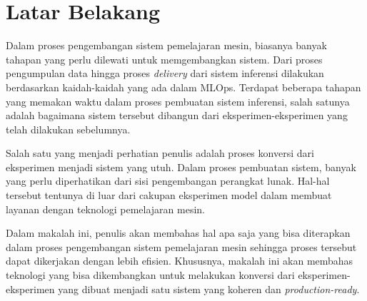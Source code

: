 \section{Latar Belakang}

Dalam proses pengembangan sistem pemelajaran mesin, biasanya banyak tahapan yang perlu dilewati untuk memgembangkan sistem.
Dari proses pengumpulan data hingga proses \textit{delivery} dari sistem inferensi dilakukan berdasarkan kaidah-kaidah yang ada dalam MLOps.
Terdapat beberapa tahapan yang memakan waktu dalam proses pembuatan sistem inferensi, salah satunya adalah bagaimana sistem tersebut dibangun dari eksperimen-eksperimen yang telah dilakukan sebelumnya.

Salah satu yang menjadi perhatian penulis adalah proses konversi dari eksperimen menjadi sistem yang utuh.
Dalam proses pembuatan sistem, banyak yang perlu diperhatikan dari sisi pengembangan perangkat lunak.
Hal-hal tersebut tentunya di luar dari cakupan eksperimen model dalam membuat layanan dengan teknologi pemelajaran mesin.

Dalam makalah ini, penulis akan membahas hal apa saja yang bisa diterapkan dalam proses pengembangan sistem pemelajaran mesin sehingga proses tersebut dapat dikerjakan dengan lebih efisien.
Khususnya, makalah ini akan membahas teknologi yang bisa dikembangkan untuk melakukan konversi dari eksperimen-eksperimen yang dibuat menjadi satu sistem yang koheren dan \textit{production-ready}.